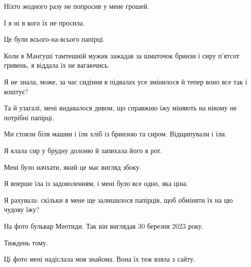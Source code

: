 Ніхто жодного разу не попросив у мене грошей. 

І я ні в кого їх не просила. 

Це були всього-на-всього папірці.

Коли в Мангуші тамтешній мужик зажадав за шматочок бринзи і сиру п’ятсот
гривень, я віддала їх не вагаючись.

Я не знала, може, за час сидіння в підвалах усе змінилося й тепер воно все так
і коштує? 

Та й узагалі, мені видавалося дивом, що справжню їжу міняють на нікому не
потрібні папірці. 

Ми стояли біля машин і їли хліб із бринзою та сиром. Відщипували і їли. 

Я клала сир у брудну долоню й запихала його в рот. 

Мені було начхати, який це має вигляд збоку. 

Я вперше їла із задоволенням, і мені було все одно, яка ціна. 

Я рахувала:  скільки в мене ще  залишилося папірців, щоб   обміняти їх на цю
чудову їжу? 

На фото бульвар Меотиди. Так він виглядав  30 березня 2023 року. 

Тиждень  тому. 

Ці фото мені надіслала моя знайома. Вона їх теж взяла з сайту.

